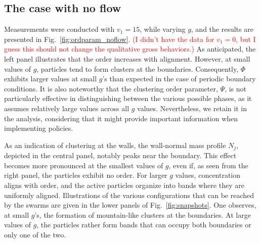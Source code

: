 \documentclass[aps,prl,twocolumn,amsmath,amssymb,superscriptaddress]{revtex4-1}
\newcommand{\obs}[1]{\textcolor{red}{#1}}
\begin{document}
\subsection{The case with no flow}
Measurements were conducted with $v_1=15$, while varying $g$, and the results are presented in Fig.~\ref{fig:ordparam_noflow}. \obs{(I didn't have the data for $v_1=0$, but I guess this should not change the qualitative gross behaviors.)} As anticipated, the left panel illustrates that the order increases with alignment. However, at small values of $g$, particles tend to form clusters at the boundaries. Consequently, $\Phi$ exhibits larger values at small $g$'s than expected in the case of periodic boundary conditions. It is also noteworthy that the clustering order parameter, $\Psi$, is not particularly effective in distinguishing between the various possible phases, as it assumes relatively large values across all $g$ values. Nevertheless, we retain it in the analysis, considering that it might provide important information when implementing policies.

As an indication of clustering at the walls, the wall-normal mass profile $N_j$, depicted in the central panel, notably peaks near the boundary. This effect becomes more pronounced at the smallest values of $g$, even if, as seen from the right panel, the particles exhibit no order. For larger $g$ values, concentration aligns with order, and the active particles organize into bands where they are uniformly aligned. Illustrations of the various configurations that can be reached by the swarms are given in the lower panels of Fig.~\ref{fig:snapshots}. One observes, at small $g$'s, the formation of mountain-like clusters at the boundaries. At large values of $g$, the particles rather form bands that can occupy both boundaries or only one of the two.
\end{document}
